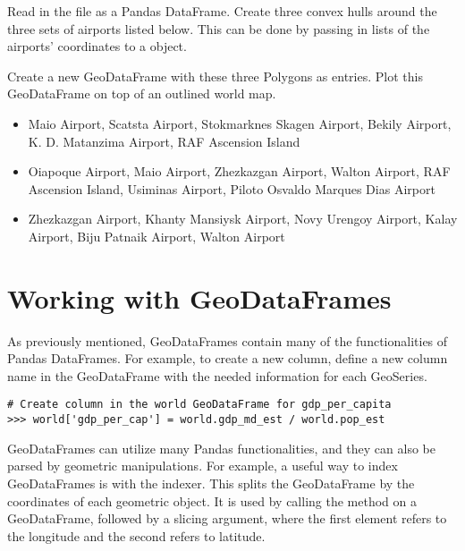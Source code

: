 \begin{problem}
Read in the file  as a Pandas DataFrame.
Create three convex hulls around the three sets of airports listed below.
This can be done by passing in lists of the airports' coordinates to a  object.
	
Create a new GeoDataFrame with these three Polygons as entries.
Plot this GeoDataFrame on top of an outlined world map.
\begin{itemize} %
	\item Maio Airport, Scatsta Airport, Stokmarknes Skagen Airport, Bekily Airport, K. D. Matanzima Airport, RAF Ascension Island
	\item Oiapoque Airport, Maio Airport, Zhezkazgan Airport, Walton Airport, RAF Ascension Island, Usiminas Airport, Piloto Osvaldo Marques Dias Airport
	\item Zhezkazgan Airport, Khanty Mansiysk Airport, Novy Urengoy Airport, Kalay Airport, Biju Patnaik Airport, Walton Airport
\end{itemize}
\end{problem}

\section*{Working with GeoDataFrames} %

As previously mentioned, GeoDataFrames contain many of the functionalities of Pandas DataFrames.
For example, to create a new column, define a new column name in the GeoDataFrame with the needed information for each GeoSeries.

\begin{lstlisting}
# Create column in the world GeoDataFrame for gdp_per_capita
>>> world['gdp_per_cap'] = world.gdp_md_est / world.pop_est
\end{lstlisting}

GeoDataFrames can utilize many Pandas functionalities, and they can also be parsed by geometric manipulations.
For example, a useful way to index GeoDataFrames is with the  indexer.
This splits the GeoDataFrame by the coordinates of each geometric object.
It is used by calling the method  on a GeoDataFrame, followed by a slicing argument, where the first element refers to the longitude and the second refers to latitude.

